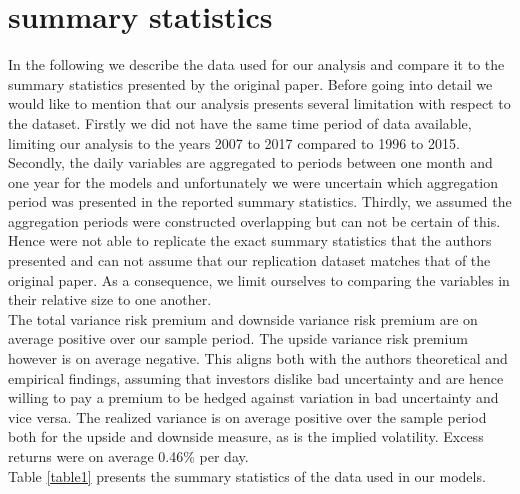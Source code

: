 \documentclass{article}
\begin{document}
\section{summary statistics}

In the following we describe the data used for our analysis and compare it to the summary statistics presented by the original paper. Before going into detail we would like to mention that our analysis presents several limitation with respect to the dataset. Firstly we did not have the same time period of data available, limiting our analysis to the years 2007 to 2017 compared to 1996 to 2015. Secondly, the daily variables are aggregated to periods between one month and one year for the models and unfortunately we were uncertain which aggregation period was presented in the reported summary statistics.  Thirdly, we assumed the aggregation periods were constructed overlapping but can not be certain of this. Hence were not able to replicate the exact summary statistics that the authors presented and can not assume that our replication dataset matches that of the original paper. As a consequence, we limit ourselves to comparing the variables in their relative size to one another.\\

The total variance risk premium and downside variance risk premium are on average positive over our sample period. The upside variance risk premium however is on average negative. This aligns both with the authors theoretical and empirical findings, assuming that investors dislike bad uncertainty and are hence willing to pay a premium to be hedged against variation in bad uncertainty and vice versa. The realized variance is on average positive over the sample period both for the upside and downside measure, as is the implied volatility. Excess returns were on average 0.46$\%$ per day.\\



Table \ref{table1} presents the summary statistics of the data used in our models. 
\end{document}
